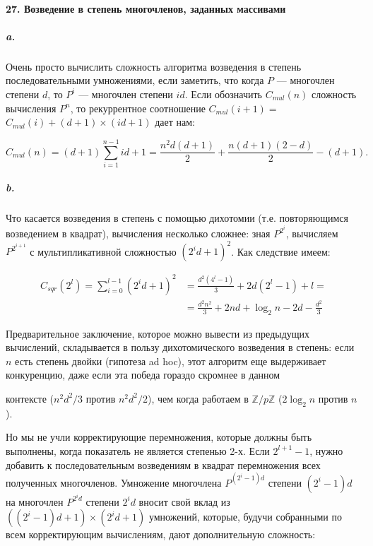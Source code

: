 \documentclass{../../template/mai_book}
\begin{document}
\paragraph{27. Возведение в степень многочленов, заданных массивами}

\subparagraph{a.} Очень просто вычислить сложность алгоритма возведения в степень последовательными умножениями, если заметить, что когда $P$ — многочлен степени $d$, то $P^i$ — многочлен степени $id$. Если обозначить $C_{mul}(n)$ сложность вычисления $P^n$, то рекуррентное соотношение $C_{mul}(i + 1) =$ \linebreak $C_{mul}(i) + (d + 1) \times (id + 1)$ дает нам:

\begin{equation*}
C_{mul}(n) = (d + 1) \sum_{i = 1}^{n - 1} id + 1 = \frac{n^2 d(d + 1)}{2} + \frac{n(d + 1)(2 - d)}{2} - (d + 1).
\end{equation*}

\subparagraph{b.} Что касается возведения в степень с помощью дихотомии (т.е. повторяющимся возведением в квадрат), вычисления несколько сложнее: зная $P^{2^i}$, вычисляем $P^{2^{i + 1}}$ с мультипликативной сложностью $(2^i d + 1)^2$. Как следствие имеем:

\begin{equation*}
	\begin{split}
	C_{sqr}(2^l) = \sum_{i = 0}^{l - 1} (2^i d + 1)^2 &= \frac{d^2 (4^l - 1)}{3} + 2d(2^l - 1) + l =
	\\
	&= \frac{d^2 n^2}{3} + 2nd + \log_2 n - 2d - \frac{d^2}{3}
	\end{split}
\end{equation*}

\noindent
Предварительное заключение, которое можно вывести из предыдущих вычислений, складывается в пользу дихотомического возведения в степень: если $n$ есть степень двойки (гипотеза ad hoc), этот алгоритм еще выдерживает конкуренцию, даже если эта победа гораздо скромнее в данном \linebreak

\newpage


\noindent
контексте ($n^2 d^2 / 3$ против $n^2 d^2 / 2$), чем когда работаем в $\mathbb{Z} / p \mathbb{Z}$ ($2 \log_2 n$ против $n$).

Но мы не учли корректирующие перемножения, которые должны быть выполнены, когда показатель не является степенью 2-х. Если $2^{l + 1} - 1$, нужно добавить к последовательным возведениям в квадрат перемножения всех полученных многочленов. Умножение многочлена $P^{(2^i - 1)d}$ степени $(2^i - 1)d$ на многочлен $P^{2^i d}$ степени $2^i d$ вносит свой вклад из $((2^i - 1)d + 1) \times (2^i d + 1)$ умножений, которые, будучи собранными по всем корректирующим вычислениям, дают дополнительную сложность:
\end{document}
